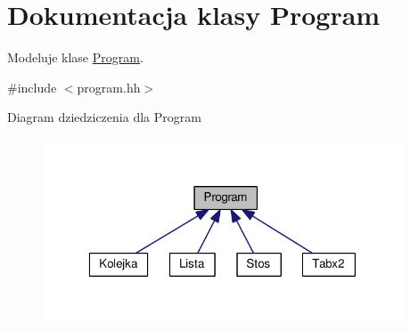 \hypertarget{class_program}{\section{Dokumentacja klasy Program}
\label{class_program}
}


Modeluje klase \hyperlink{class_program}{Program}.  




{\ttfamily \#include $<$program.\-hh$>$}



Diagram dziedziczenia dla Program\nopagebreak
\begin{figure}[H]
\begin{center}
\leavevmode
\includegraphics[width=303pt]{class_program__inherit__graph}
\end{center}
\end{figure}
